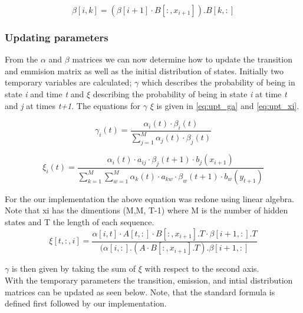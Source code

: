 \begin{equation}
    \beta[i,k] = (\beta[i+1] \cdot B[:,x_{i+1}])\textbf{.}B[k,:]
    \label{eq:bw_linalg}
\end{equation}

\subsubsection{Updating parameters} \label{seq:upt_par}

From the $\alpha$ and $\beta$ matrices we can now determine how to update the transition and emmision matrix as well as the initial distribution of states. Initially two temporary variables are calculated; $\gamma$ which describes the probability of being in state \textit{i} and time \textit{t} and $\xi$ describing the probability of being in state \textit{i} at time \textit{t} and \textit{j} at times \textit{t+1}. The equations for $\gamma$ $\xi$ is given in \autoref{eq:upt_ga} and \autoref{eq:upt_xi}.

\begin{equation}
    \gamma_i(t) = \frac{\alpha_i(t) \cdot \beta_i(t)}{\sum_{j=1}^M \alpha_j(t)\cdot\beta_j(t)}
    \label{eq:upt_ga}
\end{equation}

\begin{equation}
    \xi_i(t) = \frac{\alpha_i(t)\cdot a_{ij} \cdot \beta_j(t+1) \cdot b_j(x_{i+1})}{\sum_{k=1}^{M} \sum_{w=1}^M \alpha_k(t) \cdot a_{kw} \cdot \beta_w(t+1) \cdot b_w(y_{t+1})}
    \label{eq:upt_xi}
\end{equation}

For the our implementation the above equation was redone using linear algebra.
Note that xi has the dimentions (M,M, T-1) where M is the number of hidden states and T the length of each sequence.
\begin{equation}
    \xi[t,:, i] = \frac{\alpha[i,t] \cdot A[t,:] \cdot B[:, x_{i+1}].T \cdot \beta[i+1,:].T}{(\alpha[i,:]\textbf{.}(A \cdot B[:, x_{i+1}].T)\textbf{.}\beta[i+1, :]}
\end{equation}

\noindent
$\gamma$ is then given by taking the sum of $\xi$ with respect to the second axis.\\

\noindent
With the temporary parameters the transition, emission, and intial distribution matrices can be updated as seen below. 
Note, that the standard formula is defined first followed by our implementation.\\

